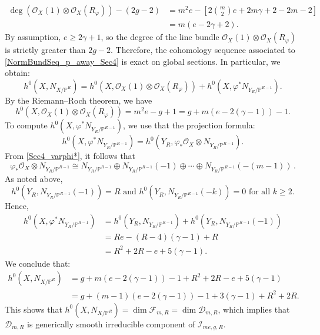 \documentclass[a4paper,12pt]{amsart}
\def\dim{\operatorname{dim}}
\begin{document}
\[
\begin{aligned}
 \deg (\mathcal{O}_X (1) \otimes \mathcal{O}_X (R_{\varphi})) - (2g-2) & = m^2 e - \left[ 2\binom{m}{2}e + 2m\gamma + 2 - 2m - 2 \right] \\
 & = m (e - 2\gamma + 2).
\end{aligned}
\]
By assumption, $e \geq 2\gamma + 1$, so the degree of the line bundle $\mathcal{O}_X (1) \otimes \mathcal{O}_X (R_{\varphi})$ is strictly greater than $2g-2$. Therefore, the cohomology sequence associated to \eqref{NormBundSeq_p_away_Sec4} is exact on global sections. In particular, we obtain:
\[
 h^0 (X, N_{X / \mathbb{P}^R}) = h^0 (X,\mathcal{O}_X (1) \otimes \mathcal{O}_X (R_{\varphi})) + h^0 (X, \varphi^{\ast} N_{Y_R / \mathbb{P}^{R-1}}).
\]
By the Riemann–Roch theorem, we have
\[
 h^0 (X,\mathcal{O}_X (1) \otimes \mathcal{O}_X (R_{\varphi})) = m^2 e - g + 1 = g + m(e - 2(\gamma - 1)) - 1.
\]
To compute $h^0 (X, \varphi^{\ast} N_{Y_R / \mathbb{P}^{R-1}})$, we use that the projection formula:
\[
 h^0 (X, \varphi^{\ast} N_{Y_R / \mathbb{P}^{R-1}}) = h^0 (Y_R, \varphi_{\ast} \mathcal{O}_X \otimes N_{Y_R / \mathbb{P}^{R-1}}) .
\]
From \eqref{Sec4_varphi*}, it follows that
\[
 \varphi_{\ast} \mathcal{O}_X \otimes N_{Y_R / \mathbb{P}^{R-1}} \cong N_{Y_R / \mathbb{P}^{R-1}} \oplus N_{Y_R / \mathbb{P}^{R-1}} (-1) \oplus \cdots \oplus N_{Y_R / \mathbb{P}^{R-1}} (-(m-1)) \, .
\]
As noted above,
\[
 h^0 (Y_R, N_{Y_R / \mathbb{P}^{R-1}} (-1)) = R \mbox{ and } h^0 (Y_R, N_{Y_R / \mathbb{P}^{R-1}} (-k)) = 0 \mbox{ for all } k \geq 2.
\]
Hence,
\[
 \begin{aligned}
  h^0 (X, \varphi^{\ast} N_{Y_R / \mathbb{P}^{R-1}}) & = h^0 (Y_R, N_{Y_R / \mathbb{P}^{R-1}}) + h^0 (Y_R, N_{Y_R / \mathbb{P}^{R-1}} (-1)) \\
  & = Re - (R-4)(\gamma - 1) + R \\
  & = R^2 + 2R - e + 5(\gamma - 1) .
 \end{aligned}
\]
We conclude that:
\[
\begin{aligned}
 h^0 (X, N_{X / \mathbb{P}^R}) & = g + m(e - 2(\gamma - 1)) - 1 + R^2 + 2R - e + 5(\gamma - 1) \\
 & = g + (m-1)(e - 2(\gamma-1)) - 1 + 3(\gamma-1) + R^2 + 2R .
\end{aligned}
\]
This shows that $h^0 (X, N_{X / \mathbb{P}^R}) = \dim \mathcal{F}_{m,R} = \dim \mathcal{D}_{m,R}$, which implies that $\mathcal{D}_{m,R}$ is generically smooth irreducible component of $\mathcal{I}_{me,g,R}$.

\medskip
\end{document}
